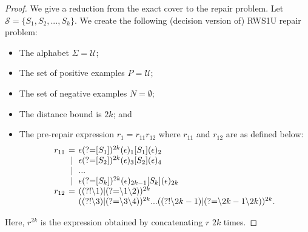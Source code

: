 \documentclass[conference]{IEEEtran}
\newcommand{\ltp}{RWS1U}
\begin{document}
\begin{proof}
We give a reduction from the exact cover to the repair problem.  Let  $\mathcal{S} = \{ S_1, S_2, ..., S_k \}$.
We create the following (decision version of) \ltp{} repair problem:
\begin{itemize}
\item The alphabet $\Sigma = \mathcal{U}$;
\item The set of positive examples $P = \mathcal{U}$;
\item The set of negative examples $N = \emptyset$;
\item The distance bound is $2k$; and
\item The pre-repair expression $r_1 = r_{11}r_{12}$ where $r_{11}$ and $r_{12}$ are as defined below:
\[
\setlength\arraycolsep{2pt}
\begin{array}{rcl}
r_{11} & = & \epsilon (\mbox{?=}[S_1])^{2k} (\epsilon)_1 [S_1] (\epsilon)_2 \\
       & \mid & \epsilon (\mbox{?=}[S_2])^{2k} (\epsilon)_3 [S_2] (\epsilon)_4 \\ 
       & \mid & ... \\
       & \mid & \epsilon (\mbox{?=}[S_k])^{2k} (\epsilon)_{2k-1} [S_k] (\epsilon)_{2k} \\
r_{12} & = & ((?!\backslash1)|(\mbox{\mbox{?=}}\backslash1\backslash2))^{2k}\\&&((?!\backslash3)|(\mbox{?=}\backslash3\backslash4))^{2k} ... ((?!\backslash2k-1)|(\mbox{?=}\backslash2k-1\backslash2k))^{2k}.
\end{array}
\]
\end{itemize}
Here, $r^{2k}$ is the expression obtained by concatenating $r$ $2k$ times.



\end{proof}
\end{document}
